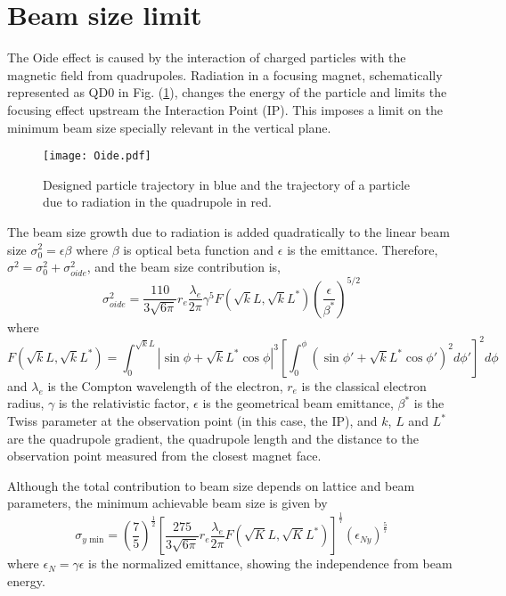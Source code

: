 \section{Beam size limit}\label{Oideeffect}
The Oide effect is caused by the interaction of charged particles with the magnetic field from quadrupoles. Radiation in a focusing magnet, schematically represented as QD0 in Fig. (\ref{f:Oideeffect}), changes the energy of the particle and limits the focusing effect upstream the Interaction Point (IP). This imposes a limit on the minimum beam size specially relevant in the vertical plane.\par%
\begin{figure}[!hbt]
\texttt{[image: Oide.pdf]}
\centering
\caption{Designed particle trajectory in blue and the trajectory of a particle due to radiation in the quadrupole in red.}\label{f:Oideeffect}
\end{figure}
 The beam size growth due to radiation is added quadratically to the linear beam size $\sigma_0^2=\epsilon\beta$ where $\beta$ is optical beta function and $\epsilon$ is the emittance. Therefore, $ \sigma^2 = \sigma_0^2 + \sigma_{oide}^2$, and the beam size contribution is,
 \begin{equation}
  \sigma^2_{oide} = \frac{110}{3\sqrt{6\pi}}r_e\frac{\lambda_e}{2\pi}\gamma^5 F(\sqrt{k}L,\sqrt{k}L^*)\left(\frac{\epsilon}{\beta^*}\right)^{5/2}
  \label{Oideequ}
 \end{equation}
 where
 \begin{equation}
  F(\sqrt{k}L, \sqrt{k}L^*) = \int_0^{\sqrt{k}L}|\sin\phi+\sqrt{k}L^*\cos\phi|^3\left[\int_0^\phi(\sin\phi'+\sqrt{k}L^*\cos\phi')^2 d\phi'\right]^2d\phi
  \label{OideF}
 \end{equation}
  and $\lambda_e$ is the Compton wavelength of the electron, $r_e$ is the classical electron radius, $\gamma$ is the relativistic factor, $\epsilon$ is the geometrical beam emittance, $\beta^*$ is the Twiss parameter at the observation point (in this case, the IP), and $k$, $L$ and $L^*$ are the quadrupole gradient, the quadrupole length and the distance to the observation point measured from the closest magnet face.\par
   Although the total contribution to beam size depends on lattice and beam parameters, the minimum achievable beam size is given by
\begin{equation}
 \sigma_{y \text{ min}} = \left(\frac{7}{5}\right)^\frac{1}{2}\left[\frac{275}{3\sqrt{6\pi}}r_e\frac{\lambda_e}{2\pi}F(\sqrt{K}L,\sqrt{K}L^*)\right]^\frac{1}{7}(\epsilon_{Ny})^\frac{5}{7}
\end{equation}
where $\epsilon_N=\gamma\epsilon$ is the normalized emittance, showing the independence from beam energy.\par
 

